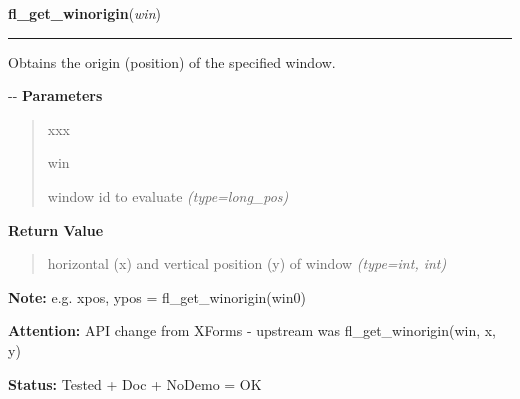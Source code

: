 \hspace{.8\funcindent}\begin{boxedminipage}{\funcwidth}

    \raggedright \textbf{fl\_get\_winorigin}(\textit{win})

    \vspace{-1.5ex}

    \rule{\textwidth}{0.5\fboxrule}
\setlength{\parskip}{2ex}

Obtains the origin (position) of the specified window.

-{}-
\setlength{\parskip}{1ex}
      \textbf{Parameters}
      \vspace{-1ex}

      \begin{quote}
        \begin{Ventry}{xxx}

          \item[win]


window id to evaluate
            {\it (type=long\_pos)}

        \end{Ventry}

      \end{quote}

      \textbf{Return Value}
    \vspace{-1ex}

      \begin{quote}

horizontal (x) and vertical position (y) of window
      {\it (type=int, int)}

      \end{quote}

\textbf{Note:} 
e.g. xpos, ypos = fl\_get\_winorigin(win0)


\textbf{Attention:} 
API change from XForms - upstream was
fl\_get\_winorigin(win, x, y)


\textbf{Status:} 
Tested + Doc + NoDemo = OK


    \end{boxedminipage}

    \label{xformslib:flxbasic:fl_get_wingeometry}

    \vspace{0.5ex}


